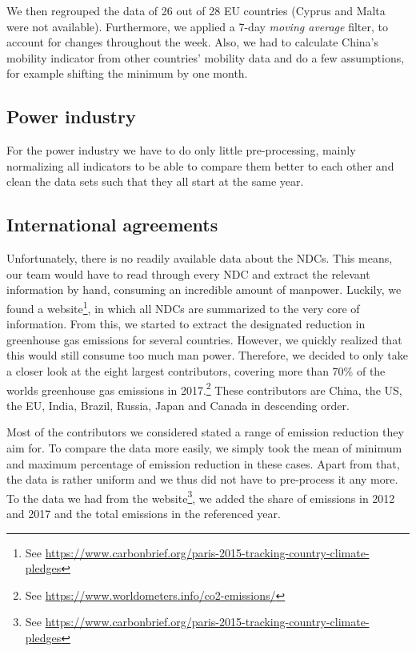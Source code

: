 We then regrouped the data of 26 out of 28 EU countries (Cyprus and Malta were not available). Furthermore, we applied a 7-day \textit{moving average} filter, to account for changes throughout the week. Also, we had to calculate China's mobility indicator from other countries' mobility data and do a few assumptions, for example shifting the minimum by one month.

\subsection*{Power industry}
For the power industry we have to do only little pre-processing, mainly normalizing all indicators to be able to compare them better to each other and clean the data sets such that they all start at the same year.


\subsection*{International agreements}

Unfortunately, there is no readily available data about the NDCs. This means, our team would have to read through every NDC and extract the relevant information by hand, consuming an incredible amount of manpower. Luckily, we found a website\footnote{See \url{https://www.carbonbrief.org/paris-2015-tracking-country-climate-pledges}}, in which  all NDCs are summarized to the very core of information. From this, we started to extract the  designated reduction in greenhouse gas emissions for several countries. However, we quickly realized that this would still consume too much man power. Therefore, we decided to only take a closer look at the eight largest contributors, covering more than 70\% of the worlds greenhouse gas emissions in 2017.\footnote{See \url{https://www.worldometers.info/co2-emissions/}} These contributors are China, the US, the EU, India, Brazil, Russia, Japan and Canada in descending order.

Most of the contributors we considered stated a range of emission reduction they aim for. To compare the data more easily, we simply took the mean of minimum and maximum percentage of emission reduction in these cases. Apart from that, the data is rather uniform and we thus did not have to pre-process it any more. To the data we had from the website\footnote{See \url{https://www.carbonbrief.org/paris-2015-tracking-country-climate-pledges}}, we added the share of \co  emissions in 2012 and 2017 and the total \co  emissions in the referenced year.

